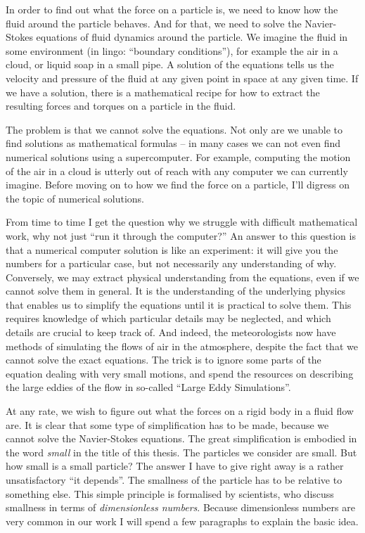 \documentclass[thesis.tex]{subfiles}
\begin{document}
In order to find out what the force on a particle is, we need to know how the fluid around the particle behaves. And for that, we need to solve the Navier-Stokes equations of fluid dynamics around the particle. We imagine the fluid in some environment (in lingo: ``boundary conditions''), for example the air in a cloud, or liquid soap in a small pipe. A solution of the equations tells us the velocity and pressure of the fluid at any given point in space at any given time. If we have a solution, there is a mathematical recipe for how to extract the resulting forces and torques on a particle in the fluid.

The problem is that we cannot solve the equations. Not only are we unable to find solutions as mathematical formulas -- in many cases we can not even find numerical solutions using a supercomputer. For example, computing the motion of the air in a cloud is utterly out of reach with any computer we can currently imagine. Before moving on to how we find the force on a particle, I'll digress on the topic of numerical solutions.

From time to time I get the question why we struggle with difficult mathematical work, why not just ``run it through the computer?'' An answer to this question is that a numerical computer solution is like an experiment: it will give you the numbers for a particular case, but not necessarily any understanding of why. Conversely, we may extract physical understanding from the equations, even if we cannot solve them in general. It is the understanding of the underlying physics that enables us to simplify the equations until it is practical to solve them. This requires knowledge of which particular details may be neglected, and which details are crucial to keep track of. 
And indeed, the meteorologists now have methods of simulating the flows of air in the atmosphere, despite the fact that we cannot solve the exact equations. The trick is to ignore some parts of the equation dealing with very small motions, and spend the resources on describing the large eddies of the flow in so-called ``Large Eddy Simulations''.

At any rate, we wish to figure out what the forces on a rigid body in a fluid flow are. It is clear that some type of simplification has to be made, because we cannot solve the Navier-Stokes equations. The great simplification is embodied in the word \emph{small} in the title of this thesis. The particles we consider are small. But how small is a small particle? The answer I have to give right away is a rather unsatisfactory ``it depends''. The smallness of the particle has to be relative to something else. This simple principle is formalised by scientists, who discuss smallness in terms of \emph{dimensionless numbers}. Because dimensionless numbers are very common in our work I will spend a few paragraphs to explain the basic idea.
\end{document}
